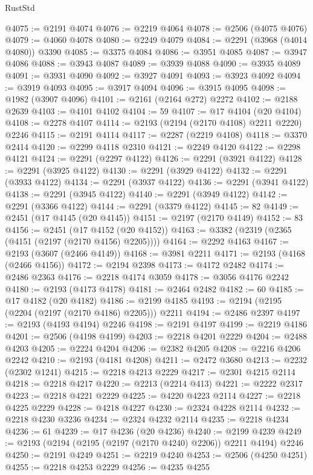 \begin{lexlean}{RustStd}
\begin{coremodule}
@4075 := @2191 @4074
@4076 := @2219 @4064
@4078 := @2506 (@4075 @4076)
@4079 := @4060 @4078
@4080 := @2249 @4079
@4084 := @2291 (@3968 (@4014 @4080)) @3390
@4085 := @3375 @4084
@4086 := @3951 @4085
@4087 := @3947 @4086
@4088 := @3943 @4087
@4089 := @3939 @4088
@4090 := @3935 @4089
@4091 := @3931 @4090
@4092 := @3927 @4091
@4093 := @3923 @4092
@4094 := @3919 @4093
@4095 := @3917 @4094
@4096 := @3915 @4095
@4098 := @1982 (@3907 @4096)
@4101 := @2161 (@2164 @272) @2272
@4102 := @2188 @2639
@4103 := @4101 @4102
@4104 := 59
@4107 := @17 @4104 (@20 @4104)
@4108 := @2278 @4107
@4114 := @2193 (@2194 (@2170 @4108) @2211 @2220) @2246
@4115 := @2191 @4114
@4117 := @2287 (@2219 @4108)
@4118 := @3370 @2414
@4120 := @2299 @4118 @2310
@4121 := @2249 @4120
@4122 := @2298 @4121
@4124 := @2291 (@2297 @4122)
@4126 := @2291 (@3921 @4122)
@4128 := @2291 (@3925 @4122)
@4130 := @2291 (@3929 @4122)
@4132 := @2291 (@3933 @4122)
@4134 := @2291 (@3937 @4122)
@4136 := @2291 (@3941 @4122)
@4138 := @2291 (@3945 @4122)
@4140 := @2291 (@3949 @4122)
@4142 := @2291 (@3366 @4122)
@4144 := @2291 (@3379 @4122)
@4145 := 82
@4149 := @2451 (@17 @4145 (@20 @4145))
@4151 := @2197 (@2170 @4149)
@4152 := 83
@4156 := @2451 (@17 @4152 (@20 @4152))
@4163 := @3382 (@2319 (@2365 (@4151 (@2197 (@2170 @4156) @2205))))
@4164 := @2292 @4163
@4167 := @2193 (@3607 (@2466 @4149))
@4168 := @3981 @2211
@4171 := @2193 (@4168 (@2466 @4156))
@4172 := @2194 @2398
@4173 := @4172 @2482
@4174 := @2486 @2363
@4176 := @2218 @4174 @3059
@4178 := @3056 @4176 @2242
@4180 := @2193 (@4173 @4178)
@4181 := @2464 @2482
@4182 := 60
@4185 := @17 @4182 (@20 @4182)
@4186 := @2199 @4185
@4193 := @2194 (@2195 (@2204 (@2197 (@2170 @4186) @2205))) @2211
@4194 := @2486 @2397
@4197 := @2193 (@4193 @4194) @2246
@4198 := @2191 @4197
@4199 := @2219 @4186
@4201 := @2506 (@4198 @4199)
@4203 := @2218 @4201 @2229
@4204 := @2488 @4203
@4205 := @2224 @4204
@4206 := @2382 @4205
@4208 := @2216 @4206 @2242
@4210 := @2193 (@4181 @4208)
@4211 := @2472 @3680
@4213 := @2232 (@2302 @1241)
@4215 := @2218 @4213 @2229
@4217 := @2301 @4215 @2114
@4218 := @2218 @4217
@4220 := @2213 (@2214 @413)
@4221 := @2222 @2317
@4223 := @2218 @4221 @2229
@4225 := @4220 @4223 @2114
@4227 := @2218 @4225 @2229
@4228 := @4218 @4227
@4230 := @2324 @4228 @2114
@4232 := @2218 @4230 @3236
@4234 := @2324 @4232 @2114
@4235 := @2218 @4234
@4236 := 61
@4239 := @17 @4236 (@20 @4236)
@4240 := @2199 @4239
@4249 := @2193 (@2194 (@2195 (@2197 (@2170 @4240) @2206)) @2211 @4194) @2246
@4250 := @2191 @4249
@4251 := @2219 @4240
@4253 := @2506 (@4250 @4251)
@4255 := @2218 @4253 @2229
@4256 := @4235 @4255

\end{coremodule}
\end{lexlean}
